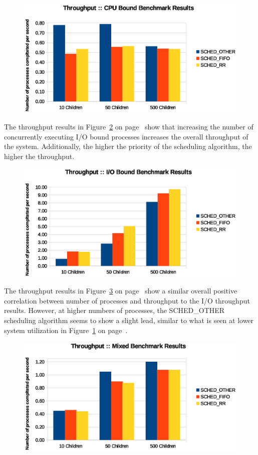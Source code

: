 \begin{figure}[H]
  \centering
  \includegraphics[scale=0.8]{img/cpu-thruput-child.eps}
  \caption{}
  \label{fig:cpu-thruput-child}
\end{figure}

The throughput results in Figure~\ref{fig:io-thruput-child} on page~\pageref{fig:io-thruput-child} show that increasing the number of concurrently executing I/O bound processes increases the overall throughput of the system.  Additionally, the higher the priority of the scheduling algorithm, the higher the throughput.

\begin{figure}[H]
  \centering
  \includegraphics[scale=0.8]{img/io-thruput-child.eps}
  \caption{}
  \label{fig:io-thruput-child}
\end{figure}

The throughput results in Figure~\ref{fig:mix-thruput-child} on page~\pageref{fig:mix-thruput-child} show a similar overall positive correlation between number of processes and throughput to the I/O throughput results.  However, at higher numbers of processes, the SCHED\_OTHER scheduling algorithm seems to show a slight lead, similar to what is seen at lower system utilization in Figure~\ref{fig:cpu-thruput-child} on page~\pageref{fig:cpu-thruput-child}.

\begin{figure}[H]
  \centering
  \includegraphics[scale=0.8]{img/mix-thruput-child.eps}
  \caption{}
  \label{fig:mix-thruput-child}
\end{figure}
